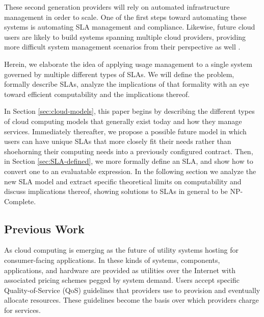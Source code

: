 \documentclass[a4paper,twoside]{article}
\begin{document}
These second generation providers will rely on automated infrastructure management in order to scale.  One of the first steps toward automating these systems is automating SLA management and compliance.  Likewise, future cloud users are likely to build systems spanning multiple cloud providers, providing more difficult system management scenarios from their perspective as well \cite{ctrl:lamb-MCCCS}.

Herein, we elaborate the idea of applying usage management to a single system governed by multiple different types of SLAs.  We will define the problem, formally describe SLAs, analyze the implications of that formality with an eye toward efficient computability and the implications thereof.

In Section \ref{sec:cloud-models}, this paper begins by describing the different types of cloud computing models that generally exist today and how they manage services.  Immediately thereafter, we propose a possible future model in which users can have unique SLAs that more closely fit their needs rather than shoehorning their computing needs into a previously configured contract.  Then, in Section \ref{sec:SLA-defined}, we more formally define an SLA, and show how to convert one to an evaluatable expression.  In the following section we analyze the new SLA model and extract specific theoretical limits on computability and discuss implications thereof, showing solutions to SLAs in general to be NP-Complete.

\subsection{Previous Work}
As cloud computing is emerging as the future of utility systems hosting for consumer-facing applications.  In these kinds of systems, components, applications, and hardware are provided as utilities over the Internet with associated pricing schemes pegged by system demand.  Users accept specific Quality-of-Service (QoS) guidelines that providers use to provision and eventually allocate resources. These guidelines become the basis over which providers charge for services.
\end{document}
